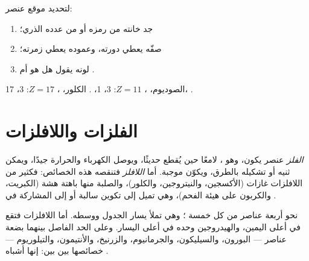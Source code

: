 \begin{method}\label{met:g9:periodic-table-first-look:read}
لتحديد موقع عنصر:
\begin{enumerate}
  \item جد خانته من رمزه أو من عدده الذري؛
  \item صفّه يعطي دورته، وعموده يعطي زمرته؛
  \item لونه يقول هل هو  أم .
\end{enumerate}
الصوديوم، ، $Z = 11$:  3،  1، . الكلور،
، $Z = 17$:  3،  17، .
\end{method}

\section{الفلزات واللافلزات}

\begin{definition}\label{def:g9:periodic-table-first-look:metal}
\emph{الفلز} عنصر يكون، وهو ، لامعًا حين يُقطع حديثًا،
ويوصل الكهرباء والحرارة جيدًا، ويمكن ثنيه أو تشكيله بالطرق، ويكوّن 
موجبة. أما \emph{اللافلز} فتنقصه هذه الخصائص: فكثير من
اللافلزات غازات (الأكسجين، والنيتروجين، والكلور)، والصلبة منها باهتة هشة
(الكبريت، والكربون على هيئة الفحم)، وهي تميل إلى تكوين  سالبة أو إلى
المشاركة  في .
\end{definition}

\begin{proposition}\label{prop:g9:periodic-table-first-look:where}
نحو أربعة عناصر من كل خمسة ؛ وهي تملأ يسار الجدول ووسطه. أما اللافلزات
فتقع في أعلى اليمين، والهيدروجين وحده في أعلى اليسار. وعلى الحد الفاصل
بينهما بضعة عناصر --- البورون، والسيليكون، والجرمانيوم، والزرنيخ،
والأنتيمون، والتيلوريوم --- خصائصها بين بين: إنها أشباه .
\end{proposition}

